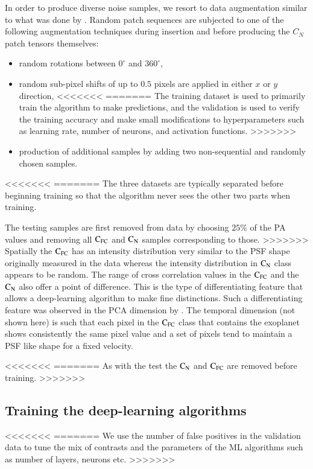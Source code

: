 \documentclass{aa}
\begin{document}
{{{In order to produce diverse noise samples, we resort to data augmentation similar to what was done by \cite{2018Gomez}.
Random patch sequences are subjected to one of the following augmentation techniques during insertion and before producing the $C_{N}$ patch tensors themselves:
\begin{itemize}
<<<<<<<
=======
One of the several strategies is to divide the data into three independent datasets called training, validation, and testing.
>>>>>>>
    \item random rotations between $0^{\circ}$ and $360^{\circ}$,
    \item random sub-pixel shifts of up to $0.5$ pixels are applied in either $x$ or $y$ direction,
<<<<<<<
=======
The training dataset is used to primarily train the algorithm to make predictions, and the validation is used to verify the training accuracy and make small modifications to hyperparameters such as learning rate, number of neurons, and activation functions. %
>>>>>>>
    \item production of additional samples by adding two non-sequential and randomly chosen samples.
\end{itemize}
<<<<<<<
=======
The three datasets are typically separated before beginning training so that the algorithm never sees the other two parts when training.

The testing samples are first removed from data by choosing $25\%$ of the PA values and removing all $\rm{C_{FC}}$ and $\rm{C_N}$ samples corresponding to those. 
>>>>>>>
Spatially the $\rm{C_{FC}}$ has an intensity distribution very similar to the PSF shape originally measured in the data whereas the intensity distribution in $\rm{C_N}$ class appears to be random.
The range of cross correlation values in the $\rm{C_{FC}}$ and the $\rm{C_N}$ also offer a point of difference.
This is the type of differentiating feature that allows a deep-learning algorithm to make fine distinctions.
Such a differentiating feature was observed in the PCA dimension by \citet{2018Gomez}.
The temporal dimension (not shown here) is such that each pixel in the $\rm{C_{FC}}$ class that contains the exoplanet shows consistently the same pixel value and a set of pixels tend to maintain a PSF like shape for a fixed velocity. 

<<<<<<<
=======
As with the test the $\rm{C_N}$ and $\rm{C_{FC}}$ are removed before training.
>>>>>>>

\subsection{Training the deep-learning algorithms}
<<<<<<<
=======
We use the number of false positives in the validation data to tune the mix of contrasts and the parameters of the ML algorithms such as number of layers, neurons etc.
>>>>>>>

}}}
\end{document}
